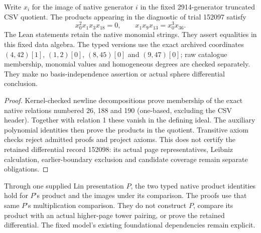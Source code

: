 \begin{proposition}
  \label{prop:lin-native-products-152097}
  \leanok
  Write $x_i$ for the image of native generator $i$ in the fixed
  2914-generator truncated CSV quotient. The products appearing in the
  diagnostic of trial 152097 satisfy
  \[
    x_0^2x_1x_3x_{18}=0,\qquad
    x_1x_9x_{13}=x_0^3x_{36}.
  \]
  The Lean statements retain the native monomial strings. They assert
  equalities in this fixed data algebra. The typed versions use the exact
  archived coordinates $(4,42)[1]$, $(1,2)[0]$, $(8,45)[0]$ and $(9,47)[0]$;
  raw catalogue membership, monomial values and homogeneous degrees are
  checked separately. They make no basis-independence assertion or actual
  sphere differential conclusion.
\end{proposition}
\begin{proof}
  \leanok
  Kernel-checked newline decompositions prove membership of the exact
  native relations numbered 26, 188 and 190 (one-based, excluding the CSV
  header). Together with relation 1 these vanish in the defining ideal.
  The auxiliary polynomial identities then prove the products in the
  quotient. Transitive axiom checks reject admitted proofs and project
  axioms. This does not certify the retained differential record 152098:
  its actual page representatives, Leibniz calculation, earlier-boundary
  exclusion and candidate coverage remain separate obligations.
\end{proof}

\begin{proposition}
  \label{prop:lin-native-products-presentation}
  \notready
  Through one supplied Lin presentation $P$, the two typed native product
  identities hold for $P$'s product and the images under its comparison.
  The proofs use that same $P$'s multiplication comparison. They do not
  construct $P$, compare its product with an actual higher-page tower
  pairing, or prove the retained differential. The fixed model's existing
  foundational dependencies remain explicit.
\end{proposition}

